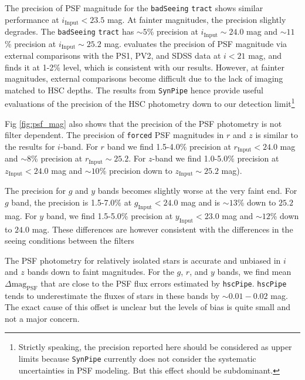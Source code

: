 \documentclass[useamsfonts]{pasj01}
\def\hscpipe{\texttt{hscPipe}}
\def\synpipe{\texttt{SynPipe}}
\def\forced{\texttt{forced}}
\def\tract{\texttt{tract}}
\begin{document}
    The precision of PSF magnitude for the \texttt{badSeeing} \tract{} shows similar 
    performance at $i_{\mathrm{Input}}<23.5$ mag. 
    At fainter magnitudes, the precision slightly degrades. 
    The \texttt{badSeeing} \tract{} has ${\sim}5$\% precision at
    $i_{\mathrm{Input}}{\sim}24.0$ mag and ${\sim}11$\% precision at
    $i_{\mathrm{Input}}{\sim}25.2$ mag.
    \citet{HSCDR1} evaluates the precision of PSF magnitude via external comparisons
    with the PS1, PV2, and SDSS data at $i<21$ mag, and finds it at 1-2\% level,
    which is consistent with our results. 
    However, at fainter magnitudes, external comparisons become difficult due to the 
    lack of imaging matched to HSC depths.
    The results from \synpipe{} hence provide useful evaluations of the precision of 
    the HSC photometry down to our detection limit\footnote{Strictly speaking, the 
    precision reported here should be considered as upper limits because 
    \synpipe{} currently does not consider the systematic uncertainties in PSF 
    modeling. But this effect should be subdominant.}

    Fig \ref{fig:psf_mag} also shows that the precision of the PSF photometry is 
    not filter dependent. 
    The precision of \forced{} PSF magnitudes in $r$ and $z$ is similar to the results
    for $i$-band. 
    For $r$ band we find 1.5-4.0\% precision at $r_{\mathrm{Input}} < 24.0$ mag and 
    ${\sim}8$\% precision at $r_{\mathrm{Input}}{\sim}25.2$. 
    For $z$-band we find 1.0-5.0\% precision at $z_{\mathrm{Input}} < 24.0$ mag and 
    ${\sim}10$\% precision down to $z_{\mathrm{Input}}{\sim}25.2$ mag).
    
    The precision for $g$ and $y$ bands becomes slightly worse at the very faint end. 
    For $g$ band, the precision is 1.5-7.0\% at $g_{\mathrm{Input}} < 24.0$ mag and is
    ${\sim}13$\% down to $25.2$ mag.
    For $y$ band, we find 1.5-5.0\% precision at $y_{\mathrm{Input}} < 23.0$ mag and
    ${\sim}12$\% down to $24.0$ mag. 
    These differences are however consistent with the differences in the seeing 
    conditions between the filters 
    

    The PSF photometry for relatively isolated stars is accurate and unbiased in $i$ 
    and $z$ bands down to faint magnitudes. 
    For the $g$, $r$, and $y$ bands, we find mean $\Delta \mathrm{mag}_{\mathrm{PSF}}$
    that are close to the PSF flux errors estimated by \hscpipe{}.  
    \hscpipe{} tends to underestimate the fluxes of stars in these bands by 
    ${\sim}0.01-0.02$ mag. 
    The exact cause of this offset is unclear but the levels of bias is quite small 
    and not a major concern.  
\end{document}

